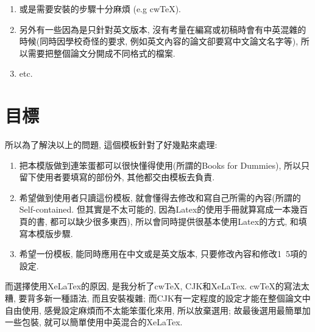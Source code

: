 \begin{enumerate}
{\begin{enumerate}
      \item
      {
        或是需要安裝的步驟十分麻煩 (e.g cwTeX\cite{web:latex:cwtex}).
      } %

      \item
      {
        另外有一些因為是只針對英文版本, 沒有考量在編寫或初稿時會有中英混雜的時候(同時因學校奇怪的要求, 例如英文內容的論文卻要寫中文論文名字等), 所以需要把整個論文分開成不同格式的檔案.
      } %

      \item
      {
        etc.
      } %
    \end{enumerate}
  } %
\end{enumerate}


\section{目標}
所以為了解決以上的問題, 這個模板針對了好幾點來處理:

\begin{enumerate}

  \item
  {
    把本模版做到連笨蛋都可以很快懂得使用(所謂的Books for Dummies), 所以只留下使用者要填寫的部份外, 其他都交由模板去負責.
  } %

  \item
  {
    希望做到使用者只讀這份模板, 就會懂得去修改和寫自己所需的內容(所謂的Self-contained. 但其實是不太可能的, 因為Latex的使用手冊就算寫成一本幾百頁的書, 都可以缺少很多東西), 所以會同時提供很基本使用Latex的方式, 和填寫本模版步驟.
  } %

  \item
  {
    希望一份模板, 能同時應用在中文或是英文版本, 只要修改內容和修改1~5項的設定.
  } %

\end{enumerate}

而選擇使用XeLaTex的原因, 是我分析了cwTeX, CJK和XeLaTex.
cwTeX的寫法太糟, 要背多新一種語法, 而且安裝複雜\cite{web:latex:cwtex}; 而CJK有一定程度的設定才能在整個論文中自由使用, 感覺設定麻煩而不太能笨蛋化來用, 所以放棄選用; 故最後選用最簡單加一些包裝, 就可以簡單使用中英混合的XeLaTex.

